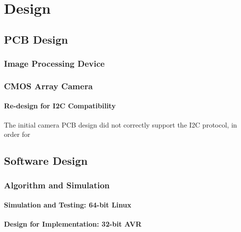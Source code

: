 
\chapter{Design} %

\label{Design} %


\section{PCB Design}
\subsection{Image Processing Device}
\subsection{CMOS Array Camera}
\subsubsection{Re-design for I2C Compatibility} 
The initial camera PCB design did not correctly support the I2C protocol, in order for 


\section{Software Design}
\subsection{Algorithm and Simulation}
\subsubsection{Simulation and Testing: 64-bit Linux}

\subsubsection{Design for Implementation: 32-bit AVR}

